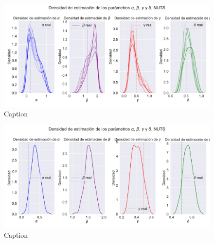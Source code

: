 \begin{figure}[h]
    \centering
    \includegraphics[width=0.8\linewidth]{img/content/chapter4/NUTS_seir_params_density.pdf}
    \caption{Caption}
    \label{fig:enter-label}
\end{figure}

\begin{figure}[h]
    \centering
    \includegraphics[width=0.8\linewidth]{img/content/chapter4/NUTS_seir_params_density_mean.pdf}
    \caption{Caption}
    \label{fig:enter-label}
\end{figure}